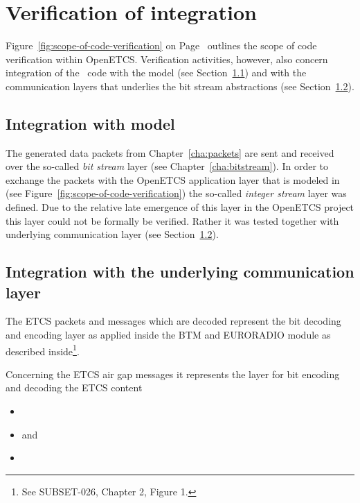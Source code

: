 
\chapter{Verification of integration}
\label{cha:integration}

Figure~\ref{fig:scope-of-code-verification} on Page~\pageref{fig:scope-of-code-verification}
outlines the scope of code verification within OpenETCS.
Verification activities, however, also concern integration of the \isoc~code
with the \scade model (see Section~\ref{sec:integration-with-model})
and with the communication layers that underlies the bit stream abstractions
(see Section~\ref{sec:integration-with-communication}).

\section{Integration with \scade model}
\label{sec:integration-with-model}

The generated data packets from Chapter~\ref{cha:packets}
are sent and received over the so-called \emph{bit stream} layer
(see Chapter~\ref{cha:bitstream}).
In order to exchange the packets with the OpenETCS application
layer that is modeled in \scade (see Figure~\ref{fig:scope-of-code-verification})
the so-called \emph{integer stream} layer was defined.
Due to the relative late emergence of this layer in the OpenETCS project
this layer could not be formally be verified.
Rather it was tested together with underlying communication layer
(see Section~\ref{sec:integration-with-communication}).


\section{Integration with the underlying communication layer}
\label{sec:integration-with-communication}

The ETCS packets and messages which are decoded represent the bit
decoding and encoding layer as applied inside the
BTM and EURORADIO module as described inside\footnote{%
	See SUBSET-026, Chapter 2, Figure 1.
}.

Concerning the ETCS air gap messages it represents the layer for
bit encoding and decoding the ETCS content  
\begin{itemize}
\item {}
\item {} and
\item {}
\end{itemize}

